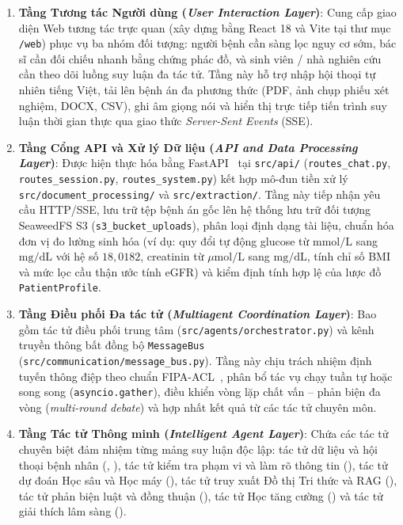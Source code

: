 \begin{enumerate}[label=\textbf{Tầng \arabic*.}, wide=0pt, leftmargin=1.8cm]
  \item \textbf{Tầng Tương tác Người dùng (\emph{User Interaction Layer})}:
  Cung cấp giao diện Web tương tác trực quan (xây dựng bằng React 18 và Vite tại thư mục \texttt{/web}) phục vụ ba nhóm đối tượng: người bệnh cần sàng lọc nguy cơ sớm, bác sĩ cần đối chiếu nhanh bằng chứng phác đồ, và sinh viên / nhà nghiên cứu cần theo dõi luồng suy luận đa tác tử. Tầng này hỗ trợ nhập hội thoại tự nhiên tiếng Việt, tải lên bệnh án đa phương thức (PDF, ảnh chụp phiếu xét nghiệm, DOCX, CSV), ghi âm giọng nói và hiển thị trực tiếp tiến trình suy luận thời gian thực qua giao thức \emph{Server-Sent Events} (SSE).

  \item \textbf{Tầng Cổng API và Xử lý Dữ liệu (\emph{API and Data Processing Layer})}:
  Được hiện thực hóa bằng FastAPI~\cite{fastapi} tại \texttt{src/api/} (\texttt{routes\_chat.py}, \texttt{routes\_session.py}, \texttt{routes\_system.py}) kết hợp mô-đun tiền xử lý \texttt{src/document\_processing/} và \texttt{src/extraction/}. Tầng này tiếp nhận yêu cầu HTTP/SSE, lưu trữ tệp bệnh án gốc lên hệ thống lưu trữ đối tượng SeaweedFS S3 (\texttt{s3\_bucket\_uploads}), phân loại định dạng tài liệu, chuẩn hóa đơn vị đo lường sinh hóa (ví dụ: quy đổi tự động glucose từ $\text{mmol/L}$ sang $\text{mg/dL}$ với hệ số $18{,}0182$, creatinin từ $\mu\text{mol/L}$ sang $\text{mg/dL}$, tính chỉ số BMI và mức lọc cầu thận ước tính eGFR) và kiểm định tính hợp lệ của lược đồ \texttt{PatientProfile}.

  \item \textbf{Tầng Điều phối Đa tác tử (\emph{Multiagent Coordination Layer})}:
  Bao gồm tác tử điều phối trung tâm  (\texttt{src/agents/orchestrator.py}) và kênh truyền thông bất đồng bộ \texttt{MessageBus} (\texttt{src/communication/message\_bus.py}). Tầng này chịu trách nhiệm định tuyến thông điệp theo chuẩn FIPA-ACL~\cite{fipa2002}, phân bổ tác vụ chạy tuần tự hoặc song song (\texttt{asyncio.gather}), điều khiển vòng lặp chất vấn -- phản biện đa vòng (\emph{multi-round debate}) và hợp nhất kết quả từ các tác tử chuyên môn.

  \item \textbf{Tầng Tác tử Thông minh (\emph{Intelligent Agent Layer})}:
  Chứa các tác tử chuyên biệt đảm nhiệm từng mảng suy luận độc lập: tác tử dữ liệu và hội thoại bệnh nhân (, ), tác tử kiểm tra phạm vi và làm rõ thông tin (), tác tử dự đoán Học sâu và Học máy (), tác tử truy xuất Đồ thị Tri thức và RAG (), tác tử phản biện luật và đồng thuận (), tác tử Học tăng cường () và tác tử giải thích lâm sàng ().


\end{enumerate}

